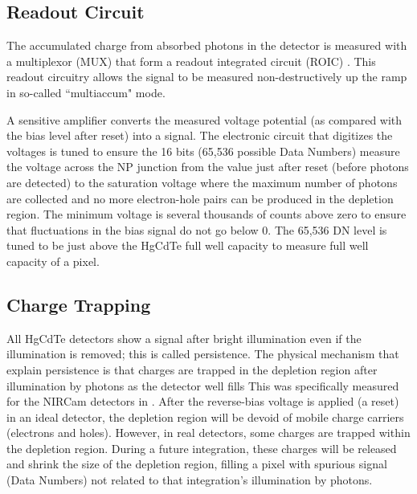 \documentclass{aastex62}
\begin{document}
\subsection{Readout Circuit}\label{sec:readout}

The accumulated charge from absorbed photons in the detector is measured with a multiplexor (MUX) that form a readout integrated circuit (ROIC) \citep{rieke2007irDetectorReview}.
This readout circuitry allows the signal to be measured non-destructively up the ramp in so-called ``multiaccum" mode.

A sensitive amplifier converts the measured voltage potential (as compared with the bias level after reset) into a signal.
The electronic circuit that digitizes the voltages is tuned to ensure the 16 bits (65,536 possible Data Numbers) measure the voltage across the NP junction from the value just after reset (before photons are detected) to the saturation voltage where the maximum number of photons are collected and no more electron-hole pairs can be produced in the depletion region.
The minimum voltage is several thousands of counts above zero to ensure that fluctuations in the bias signal do not go below 0.
The 65,536 DN level is tuned to be just above the HgCdTe full well capacity to measure full well capacity of a pixel.




\subsection{Charge Trapping}
All HgCdTe detectors show a signal after bright illumination even if the illumination is removed; this is called persistence.
The physical mechanism that explain persistence is that charges are trapped in the depletion region after illumination by photons as the detector well fills \citep{smith2008imgPersistence}
This was specifically measured for the NIRCam detectors in \citet{leisenring2016persistence}.
After the reverse-bias voltage is applied (a reset) in an ideal detector, the depletion region will be devoid of mobile charge carriers (electrons and holes).
However, in real detectors, some charges are trapped within the depletion region.
During a future integration, these charges will be released and shrink the size of the depletion region, filling a pixel with spurious signal (Data Numbers) not related to that integration's illumination by photons.
\end{document}
